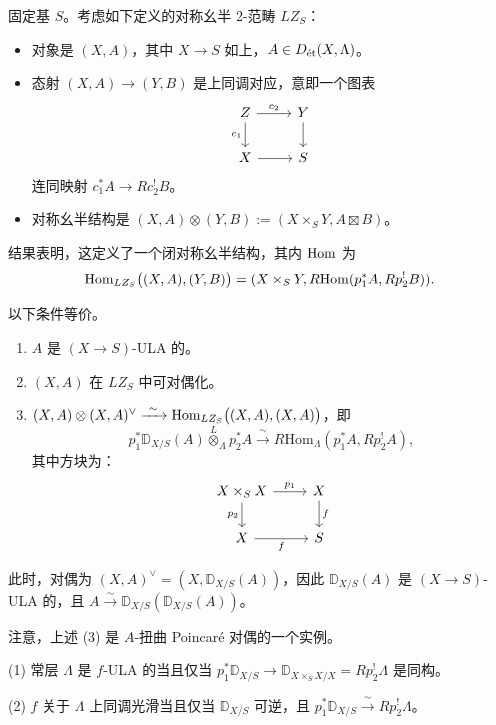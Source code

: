 固定基 $S$。考虑如下定义的对称幺半 2-范畴 $LZ_S$：
\begin{itemize}
\item 对象是 $(X,A)$，其中 $X\to S$ 如上，$A\in D_{\et}(X,\Lambda)$。
\item 态射 $(X,A)\to(Y,B)$ 是上同调对应，意即一个图表
\[
\begin{tikzcd}
Z \arrow[r, "c_2"] \arrow[d, "c_1"'] & Y \arrow[d] \\
X \arrow[r] & S
\end{tikzcd}
\]
连同映射 $c_1^*A\to Rc_2^!B$。
\item 对称幺半结构是 $(X,A)\otimes(Y,B):=(X\times_S Y,A\boxtimes B)$。
\end{itemize}

结果表明，这定义了一个闭对称幺半结构，其内 $\Hom$ 为
\[
\Hom_{LZ_S}\bigl((X,A),(Y,B)\bigr)=(X\times_S Y,R\mathrm{Hom}(p_1^*A,Rp_2^!B)).
\]

\begin{theorem}
以下条件等价。
\begin{enumerate}[label=(\arabic*)]
\item $A$ 是 $(X\to S)$-ULA 的。
\item $(X,A)$ 在 $LZ_S$ 中可对偶化。
\item $(X,A)\otimes(X,A)^\vee\xrightarrow{\ \sim\ }\Hom_{LZ_S}\bigl((X,A),(X,A)\bigr)$，即
\[
p_1^*\mathbb{D}_{X/S}(A)\overset{L}{\otimes}_\Lambda p_2^*A\xrightarrow{\ \sim\ }R\mathrm{Hom}_\Lambda(p_1^*A,Rp_2^!A),
\]
其中方块为：
\[
\begin{tikzcd}
X\times_S X \arrow[r, "p_1"] \arrow[d, "p_2"'] & X \arrow[d, "f"] \\
X \arrow[r, "f"'] & S
\end{tikzcd}
\]
\end{enumerate}
\end{theorem}

此时，对偶为 $(X,A)^\vee=(X,\mathbb{D}_{X/S}(A))$，因此 $\mathbb{D}_{X/S}(A)$ 是 $(X\to S)$-ULA 的，且 $A\xrightarrow{\sim}\mathbb{D}_{X/S}(\mathbb{D}_{X/S}(A))$。

注意，上述 (3) 是 $A$-扭曲 Poincaré 对偶的一个实例。

\begin{corollary}
(1) 常层 $\Lambda$ 是 $f$-ULA 的当且仅当 $p_1^*\mathbb{D}_{X/S}\to\mathbb{D}_{X\times_S X/X}=Rp_2^!\Lambda$ 是同构。

(2) $f$ 关于 $\Lambda$ 上同调光滑当且仅当 $\mathbb{D}_{X/S}$ 可逆，且 $p_1^*\mathbb{D}_{X/S}\xrightarrow{\ \sim\ }Rp_2^!\Lambda$。
\end{corollary}

